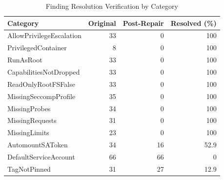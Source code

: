\documentclass[preprint,12pt]{elsarticle}
\begin{document}
\begin{table}[htbp]
\centering
\caption{Finding Resolution Verification by Category}
\label{tab:resolution_verification}
\small
\setlength{\tabcolsep}{5pt}
\renewcommand{\arraystretch}{1.1}
\begin{tabular}{lrrr}
\hline
\textbf{Category} & \textbf{Original} & \textbf{Post-Repair} & \textbf{Resolved (\%)} \\
\hline
AllowPrivilegeEscalation & 33 & 0 & 100 \\
PrivilegedContainer & 8 & 0 & 100 \\
RunAsRoot & 33 & 0 & 100 \\
CapabilitiesNotDropped & 33 & 0 & 100 \\
ReadOnlyRootFSFalse & 33 & 0 & 100 \\
MissingSeccompProfile & 35 & 0 & 100 \\
MissingProbes & 34 & 0 & 100 \\
MissingRequests & 31 & 0 & 100 \\
MissingLimits & 23 & 0 & 100 \\
AutomountSAToken & 34 & 16 & 52.9 \\
DefaultServiceAccount & 66 & 66 & 0 \\
TagNotPinned & 31 & 27 & 12.9 \\
\hline
\end{tabular}
\end{table}
\end{document}

